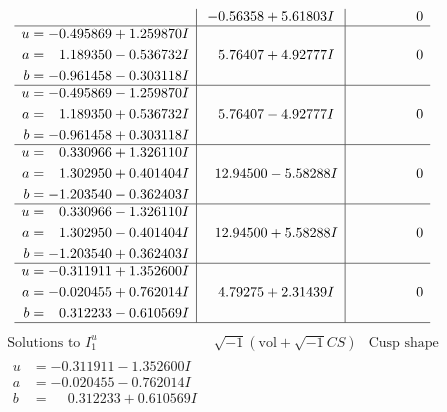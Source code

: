 \documentclass[1p]{elsarticle_modified}
\theoremstyle{definition}
\newcommand{\I}{\sqrt{-1}}
\begin{document}
$$\begin{array}{c|c|c}
 & -0.56358 + 5.61803 I & \phantom{-0.000000 } 0 \\ \hline\begin{aligned}
u &= -0.495869 + 1.259870 I \\
a &= \phantom{-}1.189350 - 0.536732 I \\
b &= -0.961458 - 0.303118 I\end{aligned}
 & \phantom{-}5.76407 + 4.92777 I & \phantom{-0.000000 } 0 \\ \hline\begin{aligned}
u &= -0.495869 - 1.259870 I \\
a &= \phantom{-}1.189350 + 0.536732 I \\
b &= -0.961458 + 0.303118 I\end{aligned}
 & \phantom{-}5.76407 - 4.92777 I & \phantom{-0.000000 } 0 \\ \hline\begin{aligned}
u &= \phantom{-}0.330966 + 1.326110 I \\
a &= \phantom{-}1.302950 + 0.401404 I \\
b &= -1.203540 - 0.362403 I\end{aligned}
 & \phantom{-}12.94500 - 5.58288 I & \phantom{-0.000000 } 0 \\ \hline\begin{aligned}
u &= \phantom{-}0.330966 - 1.326110 I \\
a &= \phantom{-}1.302950 - 0.401404 I \\
b &= -1.203540 + 0.362403 I\end{aligned}
 & \phantom{-}12.94500 + 5.58288 I & \phantom{-0.000000 } 0 \\ \hline\begin{aligned}
u &= -0.311911 + 1.352600 I \\
a &= -0.020455 + 0.762014 I \\
b &= \phantom{-}0.312233 - 0.610569 I\end{aligned}
 & \phantom{-}4.79275 + 2.31439 I & \phantom{-0.000000 } 0\\
 \hline 
 \end{array}$$\newpage$$\begin{array}{c|c|c}  
\text{Solutions to }I^u_{1}& \I (\text{vol} + \sqrt{-1}CS) & \text{Cusp shape}\\
 \hline 
\begin{aligned}
u &= -0.311911 - 1.352600 I \\
a &= -0.020455 - 0.762014 I \\
b &= \phantom{-}0.312233 + 0.610569 I\end{aligned}

\end{array}$$
\end{document}
